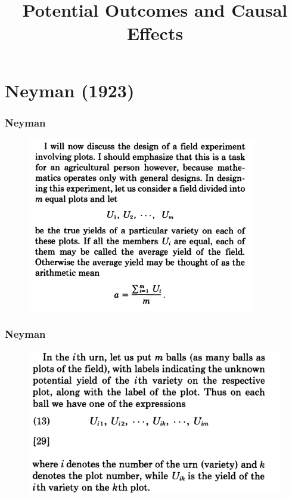 \documentclass{beamer}
\title{Potential Outcomes and Causal Effects}
\begin{document}
\frame{\titlepage}

\section{Neyman (1923)} %
\label{sec:neyman_1923_}

\begin{frame}[t]\frametitle{Neyman}
	\begin{figure}[htbp]
		\centering
			\includegraphics[height=3in]{neyman1.png}
		\label{fig:neyman1}
	\end{figure}
	
\end{frame}

\begin{frame}[t]\frametitle{Neyman}
	\begin{figure}[htbp]
		\centering
			\includegraphics[height=2.5in]{neyman2.png}
		\label{fig:neyman2}
	\end{figure}
	
\end{frame}
\end{document}
